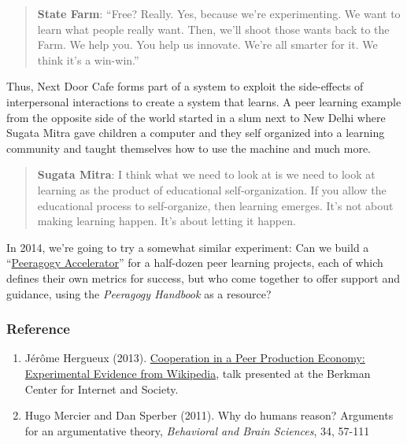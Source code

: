 \begin{quote}
\textbf{State Farm}: ``Free? Really. Yes, because we're experimenting.
We want to learn what people really want. Then, we'll shoot those wants
back to the Farm. We help you. You help us innovate. We're all smarter
for it. We think it's a win-win.''
\end{quote}
Thus, Next Door Cafe forms part of a system to exploit the side-effects
of interpersonal interactions to create a system that learns. A peer
learning example from the opposite side of the world started in a slum
next to New Delhi where Sugata Mitra gave children a computer and they
self organized into a learning community and taught themselves how to
use the machine and much more.

\begin{quote}
\textbf{Sugata Mitra}: I think what we need to look at is we need to
look at learning as the product of educational self-organization. If you
allow the educational process to self-organize, then learning emerges.
It's not about making learning happen. It's about letting it happen.
\end{quote}
In 2014, we're going to try a somewhat similar experiment: Can we build
a
``\href{http://commonsabundance.net/docs/help-build-the-peeragogy-accelerator-work-in-progress/}{Peeragogy
Accelerator}'' for a half-dozen peer learning projects, each of which
defines their own metrics for success, but who come together to offer
support and guidance, using the \emph{Peeragogy Handbook} as a resource?

\subsubsection{Reference}

\begin{enumerate}
\item
  Jérôme Hergueux (2013).
  \href{https://cyber.law.harvard.edu/interactive/events/luncheons/2013/11/jerome}{Cooperation
  in a Peer Production Economy: Experimental Evidence from Wikipedia},
  talk presented at the Berkman Center for Internet and Society.
\item
  Hugo Mercier and Dan Sperber (2011). Why do humans reason? Arguments
  for an argumentative theory, \emph{Behavioral and Brain Sciences}, 34,
  57-111
\end{enumerate}
